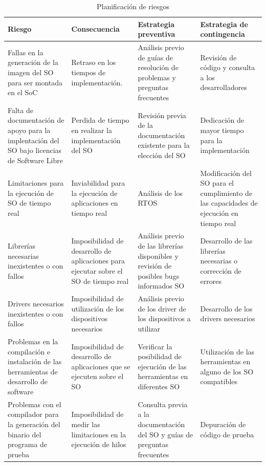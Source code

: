  		\begin{table}[h!]
		\centering
		\begin{tabular}{ p{4cm} p{4cm} p{4cm} p{3cm} }
		\hline 
		\rowcolor[gray]{0.8} Riesgo & Consecuencia & Estrategia preventiva & Estrategia de contingencia\\
		\hline
		Fallas en la generación de la imagen del SO para ser montada en el SoC &Retraso en los tiempos de implementación.& Análisis previo de guías de resolución de problemas y preguntas frecuentes & Revisión de código y consulta a los desarrolladores\\		 
		\hline
		Falta de documentación de apoyo para la implentación del SO bajo licencias de Software Libre& Perdida de tiempo en realizar la implementación del SO & Revisión previa de la documentación existente para la elección del
SO & Dedicación de mayor tiempo para la implementación\\ 
		\hline
		 Limitaciones para la ejecución de SO de tiempo real & Inviabilidad para la ejecución
de aplicaciones en tiempo real & Análisis de los RTOS &Modificación del SO para el cumplimiento de las capacidades de ejecución en tiempo real\\
		\hline
		Librerías necesarias inexistentes o con fallos& Imposibilidad de desarrollo de aplicaciones para ejecutar sobre el SO de tiempo real& Análisis previo de las librerías disponibles y revisión de posibles bugs informados SO & Desarrollo de las librerías necesarias o corrección de errores\\			
		\hline
		Drivers necesarios inexistentes o con fallos & Imposibilidad de utilización
de los dispositivos necesarios&Análisis previo de los driver de los dispositivos a utilizar& Desarrollo de los drivers necesarios\\		
		\hline
		 Problemas en la compilación e instalación de las herramientas de desarrollo de software & Imposibilidad de desarrollo de aplicaciones que se ejecuten sobre el SO& Verificar la posibilidad de ejecución de las herramientas
en diferentes SO & Utilización de las herramientas en alguno de los SO compatibles\\
		\hline
		 Problemas con el compilador para la generación del binario del programa de prueba& Imposibilidad de medir las limitaciones en la ejecución de hilos & Consulta previa a la documentación del SO y guías de preguntas frecuentes & Depuración de código de prueba\\
		\hline
		\end{tabular}
		\caption{Planificación de riesgos}
		\end{table}

